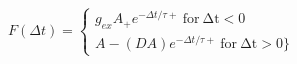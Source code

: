  $F(\Delta t) =  \begin{cases} g_{ex} A_{+} e^{−\Delta t/τ+}\:\mathrm{for\:\Delta t <0}\\A-(DA) e^{−\Delta t/τ+}\:\mathrm{for\:\Delta t > 0}\} \end{cases}$
 
